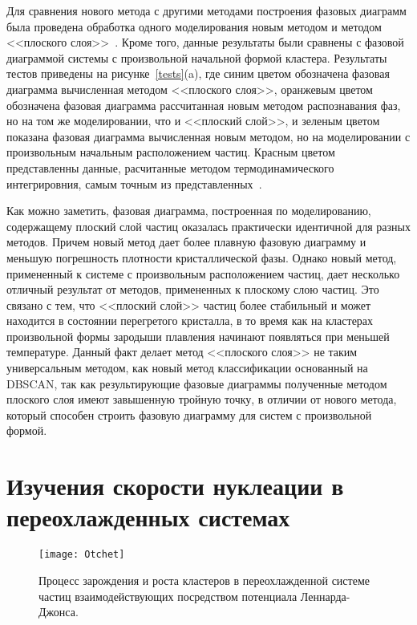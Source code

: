 Для сравнения нового метода с другими методами построения фазовых диаграмм была проведена обработка одного моделирования новым методом и методом <<плоского слоя>>~\cite{10.1021/jp806127j, 10.1021/jp1117213}.
Кроме того, данные результаты были сравнены с фазовой диаграммой системы с произвольной начальной формой кластера.
Результаты тестов приведены на рисунке~\ref{tests}(a), где синим цветом обозначена фазовая диаграмма вычисленная методом <<плоского слоя>>, оранжевым цветом обозначена фазовая диаграмма рассчитанная новым методом распознавания фаз, но на том же моделировании, что и <<плоский слой>>, и зеленым цветом показана фазовая диаграмма вычисленная новым методом, но на моделировании с произвольным начальным расположением частиц. Красным цветом представленны данные, расчитанные методом термодинамического интегрировния, самым точным из представленных~\cite{10.1080/00268976.2019.1699185}.

Как можно заметить, фазовая диаграмма, построенная по моделированию, содержащему плоский слой частиц оказалась практически идентичной для разных методов.
Причем новый метод дает более плавную фазовую диаграмму и меньшую погрешность плотности кристаллической фазы.
Однако новый метод, примененный к системе с произвольным расположением частиц, дает несколько отличный результат от методов, примененных к плоскому слою частиц.
Это связано с тем, что <<плоский слой>> частиц более стабильный и может находится в состоянии перегретого кристалла, в то время как на кластерах произвольной формы зародыши плавления начинают появляться при меньшей температуре.
Данный факт делает метод <<плоского слоя>> не таким универсальным методом, как новый метод классификации основанный на DBSCAN, так как результирующие фазовые диаграммы полученные методом плоского слоя имеют завышенную тройную точку, в отличии от нового метода, который способен строить фазовую диаграмму для систем с произвольной формой.


\section{Изучения скорости нуклеации в переохлажденных системах}
\label{PRIMe-SecNucleation}

\begin{figure}[!t]
    \centering
    \texttt{[image: Otchet]}
    \caption{Процесс зарождения и роста кластеров в переохлажденной системе частиц взаимодействующих посредством потенциала Леннарда-Джонса.}
    \label{otchet}
\end{figure}


